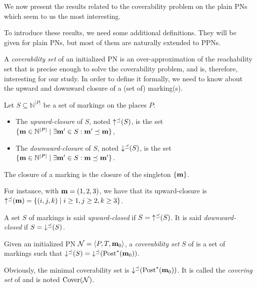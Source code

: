 We now present the results related to the coverability problem on the plain \acp{PN} which seem to us the most interesting.

To introduce these results, we need some additional definitions.
They will be given for plain \acp{PN}, but most of them are naturally extended to \acp{PPN}.

A \emph{coverability set} of an initialized \ac{PN} is an over-approximation of the reachability set that is precise enough to solve the coverability problem, and is, therefore, interesting for our study.
In order to define it formally, we need to know about the upward and downward closure of a (set of) marking(s).

\begin{defi}
  Let $S \subseteq \mathbb{N}^{|P|}$ be a set of markings on the places $P$:
  \begin{itemize}
    \item The \emph{upward-closure} of $S$, noted $\operatorname{\uparrow^\preceq}(S)$, is the set
      $\{\mathbf{m} \in \mathbb{N}^{|P|} \mid \exists \mathbf{m'} \in S : \mathbf{m'} \preceq \mathbf{m}\}$,
    \item The \emph{downward-closure} of $S$, noted $\operatorname{\downarrow^\preceq}(S)$, is the set
      $\{\mathbf{m} \in \mathbb{N}^{|P|} \mid \exists \mathbf{m'} \in S : \mathbf{m} \preceq \mathbf{m'}\}$.
  \end{itemize}
  The closure of a marking \marq is the closure of the singleton $\{\mathbf{m}\}$.
\end{defi}

For instance, with $\mathbf{m} = (1, 2, 3)$, we have that its upward-closure is $\operatorname{\uparrow^\preceq}(\mathbf{m}) = \{(i, j, k) \mid i \geq 1, j \geq 2, k \geq 3\}$.

\begin{defi}
  A set $S$ of markings is said \emph{upward-closed} if $S = \operatorname{\uparrow^\preceq}(S)$.
  It is said \emph{downward-closed} if $S = \operatorname{\downarrow^\preceq}(S)$.
\end{defi}

\begin{defi}
  Given an initialized \ac{PN} $\mathcal{N} = \langle P,T, \mathbf{m}_0\rangle$, a \emph{coverability set} $S$ of \tupleN is a set of markings such that $\operatorname{\downarrow^\preceq}(S) = \operatorname{\downarrow^\preceq}(\operatorname{Post}^*(\mathbf{m}_0))$.
\end{defi}

Obviously, the minimal coverability set is $\operatorname{\downarrow^\preceq}(\operatorname{Post}^*(\mathbf{m}_0))$.
It is called the \emph{covering set} of \tupleN and is noted $\operatorname{Cover}(\mathcal{N})$.

